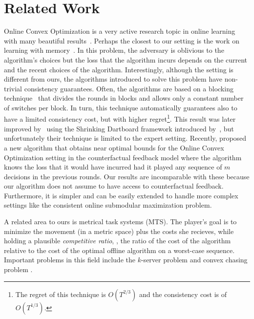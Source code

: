 \section{Related Work}
Online Convex Optimization is a very active research topic in online learning with many beautiful results~\citep{DBLP:journals/tit/MerhavOSW02}. Perhaps the closest to our setting is the work on learning with memory~\citep{DBLP:journals/tit/MerhavOSW02}. 
In this problem, the adversary is oblivious to the algorithm's choices but the loss that the algorithm incurs depends on the current and the recent choices of the algorithm. 
Interestingly, although the setting is different from ours, the algorithms introduced to solve this problem have non-trivial consistency guarantees. Often, the algorithms  are based on a blocking technique~\citep{DBLP:journals/tit/MerhavOSW02} that divides the rounds in blocks and allows only a constant number of switches per block. 
In turn, this technique automatically guarantees also to have a limited consistency cost, but with higher regret\footnote{The regret of this technique is $O(T^{2/3})$ and the consistency cost is of $O(T^{1/3})$.}. 
This result was later improved by~\cite{DBLP:journals/tit/GyorgyN14} using the Shrinking Dartboard framework introduced by~\cite{DBLP:conf/colt/GeulenVW10}, but unfortunately their technique is limited to the expert setting. Recently, \cite{DBLP:conf/nips/AnavaHM15} proposed a new algorithm that obtains near optimal bounds for the Online Convex Optimization setting in the counterfactual feedback model where the algorithm knows the loss that it would have incurred had it played any sequence of $m$ decisions in the previous rounds. 
Our results are incomparable with these because our algorithm does not assume to have access to counterfactual feedback. Furthermore, it is simpler and can be easily extended to handle more complex settings like the consistent online submodular maximization problem.

A related area to ours is metrical task systems (MTS). The player's goal is to minimize the movement (in a metric space) plus the costs she recieves, while holding a plausible \emph{competitive ratio}, \ie, the ratio of the cost of the algorithm relative to the cost of the optimal offline algorithm on a worst-case sequence. Important problems in this field include the $k$-server problem \citep{manasse1990competitive,bubeck2017} and convex chasing problem \citep{argue2019nearly}. 

